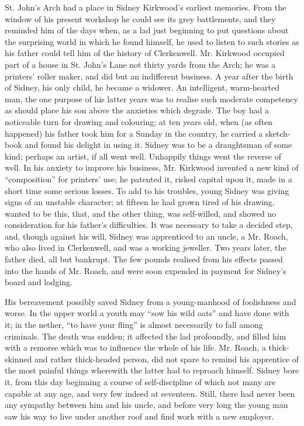 St. John's Arch had a place in Sidney Kirkwood's earliest memories. From
the window of his present workshop he could see its grey battlements,
and they reminded him of the days when, as a lad just beginning to put
questions about the surprising world in which he found himself, he used
to listen to such stories as his father could tell him of the history of
Clerkenwell. Mr. Kirkwood occupied part of a house in St. John's Lane
{\protect\hypertarget{124}{}{}}not thirty yards from the Arch; he was a
printers' roller maker, and did but an indifferent business. A year
after the birth of Sidney, his only child, he became a widower. An
intelligent, warm-hearted man, the one purpose of his latter years was
to realise such moderate competency as should place his son above the
anxieties which degrade. The boy had a noticeable turn for drawing and
colouring; at ten years old, when (as often happened) his father took
him for a Sunday in the country, he carried a sketch-book and found his
delight in using it. Sidney was to be a draughtsman of some kind;
perhaps an artist, if all went well. Unhappily things went the reverse
of well. In his anxiety to improve his business, Mr. Kirkwood invented a
new kind of ``composition'' for printers' use; he patented it, risked
capital upon it, made in a short time some serious losses. To add to his
troubles, young Sidney was giving signs of an unstable character; at
fifteen he had grown tired of his drawing, wanted to be this, that, and
the other thing, {\protect\hypertarget{125}{}{}}was self-willed, and
showed no consideration for his father's difficulties. It was necessary
to take a decided step, and, though against his will, Sidney was
apprenticed to an uncle, a Mr. Roach, who also lived in Clerkenwell, and
was a working jeweller. Two years later, the father died, all but
bankrupt. The few pounds realised from his effects passed into the hands
of Mr. Roach, and were soon expended in payment for Sidney's board and
lodging.

His bereavement possibly saved Sidney from a young-manhood of
foolishness and worse. In the upper world a youth may ``sow his wild
oats'' and have done with it; in the nether, ``to have your fling'' is
almost necessarily to fall among criminals. The death was sudden; it
affected the lad profoundly, and filled him with a remorse which was to
influence the whole of his life. Mr. Roach, a thick-skinned and rather
thick-headed person, did not spare to remind his apprentice of the most
painful things wherewith the latter had to reproach himself. Sidney bore
it, {\protect\hypertarget{126}{}{}}from this day beginning a course of
self-discipline of which not many are capable at any age, and very few
indeed at seventeen. Still, there had never been any sympathy between
him and his uncle, and before very long the young man saw his way to
live under another roof and find work with a new employer.

